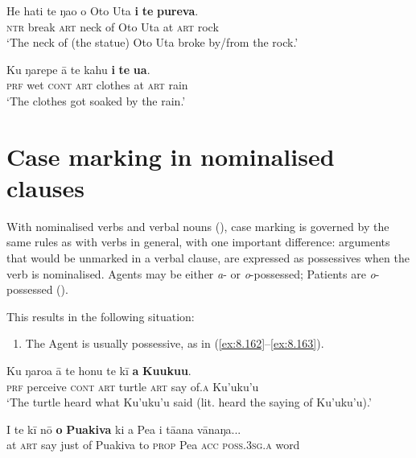 \ea\label{ex:8.160}
\gll He hati te ŋao o {\ꞌ}Oto {\ꞌ}Uta \textbf{{\ꞌ}i} \textbf{te} \textbf{pureva}. \\
\textsc{ntr} break \textsc{art} neck of Oto Uta at \textsc{art} rock \\

\glt 
‘The neck of (the statue) Oto Uta broke by/from the rock.’ \textstyleExampleref{[MsE-089.002]}
\z

\ea\label{ex:8.161}
\gll Ku ŋarepe {\ꞌ}ā te kahu \textbf{{\ꞌ}i} \textbf{te} \textbf{{\ꞌ}ua}. \\
\textsc{prf} wet \textsc{cont} \textsc{art} clothes at \textsc{art} rain \\

\glt 
‘The clothes got soaked by the rain.’ 
\z
{}

\section{Case marking in nominalised clauses}\label{sec:8.7}
With nominalised verbs and verbal nouns (), case marking is governed by the same rules as with verbs in general, with one important difference: arguments that would be unmarked in a verbal clause, are expressed as possessives when the verb is nominalised. Agents may be either \textit{a}{}- or \textit{o}{}-possessed; Patients are \textit{o}{}-possessed ().

This results in the following situation:

\begin{enumerate}
\item 
The Agent is usually possessive, as in (\ref{ex:8.162}–\ref{ex:8.163}). 
\end{enumerate}

\ea\label{ex:8.162}
\gll Ku ŋaro{\ꞌ}a {\ꞌ}ā te honu te kī \textbf{{\ꞌ}a} \textbf{Ku{\ꞌ}uku{\ꞌ}u}. \\
\textsc{prf} perceive \textsc{cont} \textsc{art} turtle \textsc{art} say of\textsc{.a} Ku’uku’u \\

\glt 
‘The turtle heard what Ku’uku’u said (lit. heard the saying of Ku’uku’u).’ \textstyleExampleref{[Ley-2-02.034]}
\z

\ea\label{ex:8.163}
\gll {\ꞌ}I te kī nō \textbf{o} \textbf{Puakiva} ki a Pea i tā{\ꞌ}ana vānaŋa... \\
at \textsc{art} say just of Puakiva to \textsc{prop} Pea \textsc{acc} \textsc{poss.3sg.a} word \\

